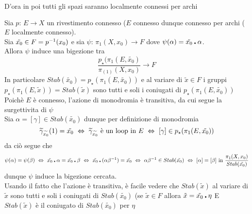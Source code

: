 \newpage
D'ora in poi tutti gli spazi saranno localmente connessi per archi 
\begin{prop}Sia $p:\, E\to X$ un rivestimento connesso ($E$ connesso dunque connesso per archi ($E$ localmente connesso).\\
Sia $\tilde{x_0}\in F = p^{-1}(x_0)$ e sia $\psi:\, \pi_1(X,x_0) \to F$ dove $\psi(\alpha)= \tilde{x_0}\centerdot \alpha$.\\
Allora $\psi$ induce una bigezione tra 
$$ \frac{p_\star(\pi_1(E,\tilde{x_0})}{\pi_(1)(X,x_0)} \to F$$
In particolare $Stab(\tilde{x_0}) = p_\star(\pi_1(E, \tilde{x_0}))$ e al variare di $\tilde{x}\in F$ i gruppi $p_\star ( \pi_1(E,\tilde{x}))= Stab(\tilde{x})$ sono tutti e soli i coniugati di $p_\star(\pi_1(E, \tilde{x_0}))$
\proof Poich\`e $E$ \`e connesso, l'azione di monodromia \`e transitiva, da cui segue la surgettivita di $\psi$\\
Sia $\alpha=[\gamma] \in Stab(\tilde{x_0})$ dunque per definizione di monodromia 
$$\widetilde{\gamma}_{\widetilde{x_0}}(1)=\tilde{x_0} \, \, \Leftrightarrow \, \, \widetilde{\gamma}_{\widetilde{x_0}} \text{ \`e un loop in } E \, \, \Leftrightarrow \, \, [\gamma] \in p_\star (\pi_1(E, \tilde{x_0}))$$
da ci\`o segue che 
$$ \psi(\alpha)=\psi(\beta)\, \, \Leftrightarrow \, \, \tilde{x_0}\centerdot \alpha = \tilde{x_0}\centerdot\beta \, \, \Leftrightarrow \,\, \tilde{x_0}\centerdot (\alpha \beta^{-1} ) =\tilde{x_0}\, \, \Leftrightarrow \,\, \alpha\beta^{-1} \in Stab(\tilde{x_0}) \, \, \Leftrightarrow \, \, [\alpha]=[\beta] \text{ in } \frac{\pi_1(X,x_0)}{Stab(\tilde{x_0})}$$
dunque $\psi$ induce la bigezione cercata.\\
Usando il fatto che l'azione \`e transitiva, \`e facile vedere che $Stab(\tilde{x})$ al variare di $\tilde{x}$ sono tutti e soli i coniugati di $Stab(\tilde{x_0})$ (se $\tilde{x}\in F$ allora $\tilde{x}=\tilde{x_0}\centerdot \eta $ E $Stab(\tilde{x})$ \`e il coniugato di $Stab(\tilde{x_0})$ per $\eta$
\endproof
\end{prop}
